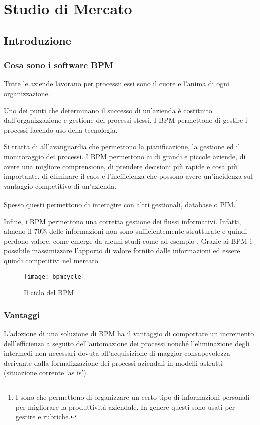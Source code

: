 \chapter{Studio di Mercato}
\section{Introduzione}
\subsection{Cosa sono i software BPM}
	
Tutte le aziende lavorano per processi: essi sono il cuore e l'anima di ogni organizzazione.
		
Uno dei punti che determinano il successo di un'azienda è costituito dall'organizzazione e gestione dei processi stessi. I \sw BPM permettono di gestire i processi facendo uso della tecnologia. 
		
Si tratta di \sw all'avanguardia che permettono la pianificazione, la gestione ed il monitoraggio dei processi.
I \sw BPM permettono  ai  di grandi e piccole aziende, di avere una migliore comprensione, di prendere decisioni più rapide e cosa più importante, di eliminare il caos e l'inefficienza che possono avere un'incidenza sul vantaggio competitivo di un'azienda.

Spesso questi \sw permettono di interagire con altri \sw gestionali, database o PIM\@.\footnote{I  sono \sw che permettono di organizzare un certo tipo di informazioni personali per migliorare la produttività aziendale. In genere questi \sw sono usati per gestire  e rubriche.}

Infine, i \sw BPM permettono una corretta gestione dei flussi informativi. Infatti, almeno il 70\% delle informazioni non sono sufficientemente strutturate e quindi perdono valore, come emerge da alcuni studi come ad esempio \cite{mazzolari:bpmita}. Grazie ai \sw BPM è possibile massimizzare l'apporto di valore fornito dalle informazioni ed essere quindi competitivi nel mercato.

\begin{figure}[H]
  \centering
  \texttt{[image: bpmcycle]}
  \caption{Il ciclo del BPM}
  \label{fig:bpmcycle}
\end{figure}


\subsection{Vantaggi}
L'adozione di una soluzione di BPM ha il vantaggio di comportare un incremento dell'efficienza a seguito dell'automazione dei processi nonché l'eliminazione degli  intermedi non necessari dovuta all'acquisizione di maggior consapevolezza derivante dalla formalizzazione dei processi aziendali in modelli astratti (situazione corrente `as is').

